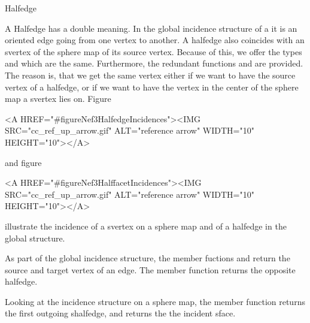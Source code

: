 
\ccRefPageBegin



\begin{ccRefClass}{Halfedge}

\ccDefinition
 
A Halfedge has a double meaning. In the global incidence structure of a
 it is an oriented edge going from one vertex to another.
A halfedge also coincides with an svertex of the sphere map of its source 
vertex. Because of this, we offer the types  and 
which are the same. Furthermore, the redundant functions 
and  are provided. The reason is, that we get the same vertex
either if we want to have the source vertex of a halfedge, or if we want to 
have the vertex in the center of the sphere map a svertex lies on. 
Figure~\begin{ccHtmlOnly}
  <A HREF="#figureNef3HalfedgeIncidences"><IMG 
  SRC="cc_ref_up_arrow.gif" ALT="reference arrow" WIDTH="10" HEIGHT="10"></A>
\end{ccHtmlOnly} and
figure~\begin{ccHtmlOnly}
  <A HREF="#figureNef3HalffacetIncidences"><IMG 
  SRC="cc_ref_up_arrow.gif" ALT="reference arrow" WIDTH="10" HEIGHT="10"></A>
\end{ccHtmlOnly} illustrate the incidence of a svertex on a sphere map and of
a halfedge in the global structure. 

As part of the global incidence structure, the member fuctions  
and  return the source and target vertex of an edge. The member
function  returns the opposite halfedge.

Looking at the incidence structure on a sphere map, the member function 
 returns the first outgoing shalfedge, and 
returns the the incident sface.


\end{ccRefClass}
